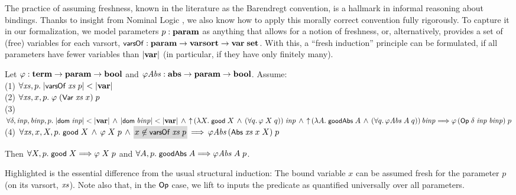 \documentclass{llncs}
\newcommand\coll[1]{\mbox{\colorbox{light-gray}{$\!#1\!$}}}
\begin{document}
The practice of assuming freshness, known in the literature as the Barendregt convention, 
is a hallmark in informal reasoning about bindings. 
Thanks to insight from Nominal Logic 
\cite{pitts-AlphaStructural,UrbanTasson,urban-Barendregt}, 
we also know how to apply this morally correct convention fully rigorously. 
To capture it in our formalization, we %
model parameters 
$p : \mbox{\bf param}$ as anything that allows for a notion of freshness, or, alternatively, 
provides a set of (free) variables for each varsort, 
$\mbox{\rm \textsf{\small vars\hspace{-0.1ex}Of}} : \mbox{\bf param} \rightarrow \mbox{\bf varsort} \rightarrow \mbox{\bf var}\;\mbox{\bf set}$. 
With this, a ``fresh induction'' principle can be formulated,  
if all parameters have fewer variables than $|\mbox{\bf var}|$ (in particular, if they have only finitely many). 

  
\begin{thm}\label{th-fresh-induct} \rm
Let $\varphi : \mbox{\bf term} \rightarrow \mbox{\bf param} \rightarrow \mbox{\bf bool}$ and $\mbox{$\varphi$\textit{Abs}} : \mbox{\bf abs} \rightarrow \mbox{\bf param} \rightarrow \mbox{\bf bool}$. %
Assume: %
\\(1) $\forall \mbox{\textit{xs}},p.\;|\mbox{\rm \textsf{\small vars\hspace{-0.1ex}Of}}\;\mbox{\textit{xs}}\;p| < |\mbox{\bf var}|$
\\(2) $\forall \mbox{\textit{xs}},x,p.\;\varphi\;(\mbox{\rm\textsf{\small Var}}\;\mbox{\textit{xs}}\;x)\;p$
\\(3) $\forall \delta,\mbox{\textit{inp}},\mbox{\textit{binp}},p.\;  
  |\mbox{\rm\textsf{\small dom}}\;\mbox{\textit{inp}}| < |\mbox{\bf var}| \,\wedge\, |\mbox{\rm\textsf{\small dom}}\;\mbox{\textit{binp}}| < |\mbox{\bf var}|  \,\wedge\,
\mbox{$\uparrow$}\,(\lambda X.\;\mbox{\rm\textsf{\small good}}\;X \,\wedge\,  (\forall q.\,\varphi\;X\;q))\;\allowbreak\mbox{\textit{inp}}  \,\wedge\, 
\mbox{$\uparrow$}\,(\lambda A.\;\mbox{\rm\textsf{\small goodAbs}}\;A \,\wedge\, 
(\forall q.\,\mbox{$\varphi$\textit{Abs}}\;A\;q))\,\mbox{\textit{binp}} \Longrightarrow \varphi\,(\mbox{\rm\textsf{\small Op}}\;\delta\;\mbox{\textit{inp}}\;\mbox{\textit{binp}})\;p$
\\(4) $\forall \xs,x,X,p.\;\good\;X \,\wedge\, \phi\;X\;p \,\wedge\, 
\coll{x \not\in \varsOf\;\xs\;p} \,\Lra\, \phiAbs\,(\Abs\;\xs\;x\;X)\;p$

Then $\forall X,p.\;\mbox{\rm\textsf{\small good}}\;X \Longrightarrow \varphi\;X\;p$ and 
$\forall A,p.\;\mbox{\rm\textsf{\small goodAbs}}\;A  \Longrightarrow \mbox{$\varphi$\textit{Abs}}\;A\;p$. %
\end{thm} 

Highlighted is the essential difference from the usual structural induction: The bound 
variable $x$ can be assumed fresh for the parameter $p$ (on its varsort, $\mbox{\textit{xs}}$). 
Note also that, in the $\mbox{\rm\textsf{\small Op}}$ case, we lift to inputs the predicate 
as quantified universally over all parameters.  

\end{document}
